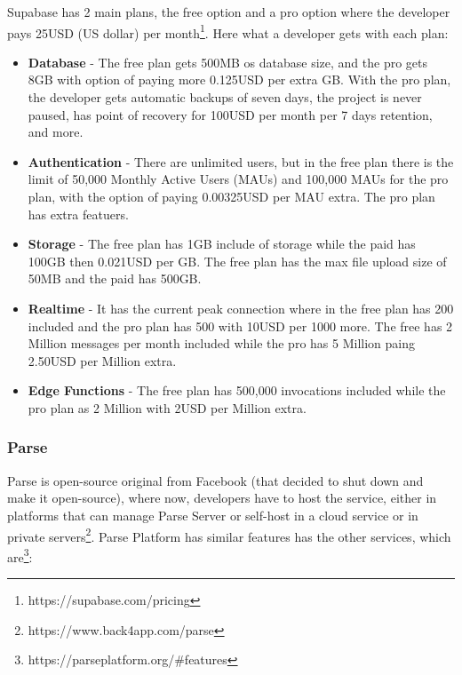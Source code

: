 Supabase has 2 main plans, the free option and a pro option where the developer pays 25USD (US dollar) per month\footnote{https://supabase.com/pricing}.
Here what a developer gets with each plan:
\begin{itemize}
	\item \textbf{Database} - The free plan gets 500MB os database size, and the pro gets 8GB with option of paying more 0.125USD per extra GB. With the pro plan, the developer gets automatic backups of seven days, the project is never paused, has point of recovery for 100USD per month per 7 days retention, and more.
	\item \textbf{Authentication} - There are unlimited users, but in the free plan there is the limit of 50,000 Monthly Active Users (MAUs) and 100,000 MAUs for the pro plan, with the option of paying 0.00325USD per MAU extra. The pro plan has extra featuers.
	\item \textbf{Storage} - The free plan has 1GB include of storage while the paid has 100GB then 0.021USD per GB. The free plan has the max file upload size of 50MB and the paid has 500GB.
	\item \textbf{Realtime} - It has the current peak connection where in the free plan has 200 included and the pro plan has 500 with 10USD per 1000 more. The free has 2 Million messages per month included while the pro has 5 Million paing 2.50USD per Million extra.
	\item \textbf{Edge Functions} - The free plan has 500,000 invocations included while the pro plan as 2 Million with 2USD per Million extra.
\end{itemize}

\subsubsection{\textbf{Parse}}

Parse is open-source original from Facebook (that decided to shut down and make it open-source), where now, developers have to host the service, either in platforms that can manage Parse Server or self-host in a cloud service or in private servers\footnote{https://www.back4app.com/parse}.
Parse Platform has similar features has the other services, which are\footnote{https://parseplatform.org/\#features}:

